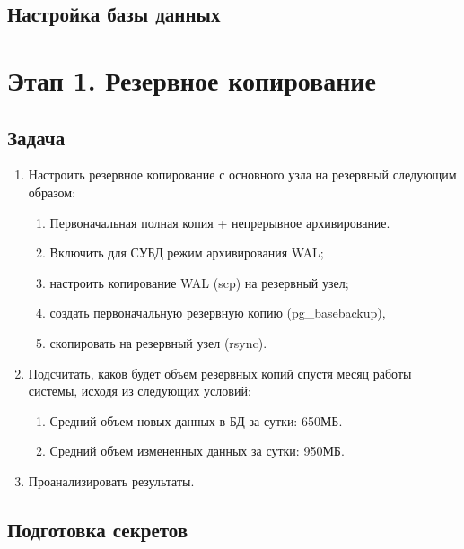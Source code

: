 \documentclass{article}
\begin{document}


\subsection{Настройка базы данных}



\section{Этап 1. Резервное копирование}

\subsection{Задача}

\begin{enumerate}
    \item Настроить резервное копирование с основного узла на резервный следующим образом:
          \begin{enumerate}
              \item Первоначальная полная копия + непрерывное архивирование.
              \item Включить для СУБД режим архивирования WAL;
              \item настроить копирование WAL (scp) на резервный узел;
              \item создать первоначальную резервную копию (pg\_basebackup),
              \item скопировать на резервный узел (rsync).
          \end{enumerate}
    \item Подсчитать, каков будет объем резервных копий спустя месяц работы системы, исходя из следующих условий:
          \begin{enumerate}
              \item Средний объем новых данных в БД за сутки: 650МБ.
              \item Средний объем измененных данных за сутки: 950МБ.
          \end{enumerate}
    \item Проанализировать результаты.
\end{enumerate}

\subsection{Подготовка секретов}
\end{document}
